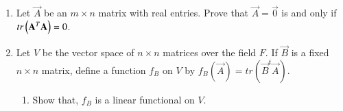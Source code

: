 \begin{enumerate}[label=\thesubsection.\arabic*.,ref=\thesubsection.\theenumi]
%
\\
\solution

\item Let $\vec{A}$ be an $m\times n$ matrix with real entries. Prove that $\vec{A}=\vec{0}$ is and only if $tr\left(\mathbf{A}^T\mathbf{A}\right)=0$.
%
\\
\solution

\item Let $V$ be the vector space of $n\times n$ matrices over the field $F$. If $\vec{B}$ is a fixed $n\times n$ matrix, define a function $f_B$ on $V$ by $f_B(\vec{A})= tr(\vec{B}^t \vec{A})$. 
%
\begin{enumerate}
\item Show that, $f_B$ is a linear functional on $V$.
\\
\solution

\end{enumerate}
\end{enumerate}
